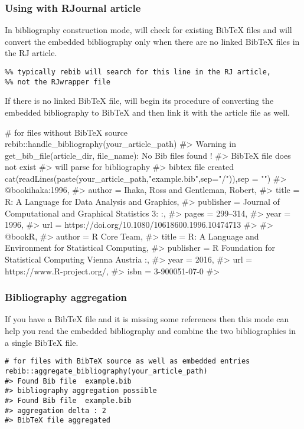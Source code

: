 \subsubsection{Using with RJournal article}
In bibliography construction mode,  will check for existing BibTeX files and will convert the embedded bibliography only when there are no linked BibTeX files in the RJ article.
\begin{verbatim}
%% typically rebib will search for this line in the RJ article, 
%% not the RJwrapper file

\end{verbatim}
If there is no linked BibTeX file,  will begin its procedure of converting the embedded bibliography to BibTeX and then link it with the article file as well.
\begin{Schunk}
\begin{Sinput}
# for files without BibTeX source
rebib::handle_bibliography(your_article_path)
#> Warning in get_bib_file(article_dir, file_name): No Bib files found !
#> BibTeX file does not exist
#> will parse for bibliography
#> bibtex file created
cat(readLines(paste(your_article_path,"example.bib",sep="/")),sep = "\n")
#> @book{ihaka:1996,
#> author = {{Ihaka, Ross and Gentleman, Robert}},
#> title = {{R: A Language for Data Analysis and Graphics}},
#> publisher = {Journal of Computational and Graphical Statistics 3:   :},
#> pages = {299--314},
#> year = {1996},
#> url = {https://doi.org/10.1080/10618600.1996.10474713}
#> }
#> @book{R,
#> author = {R {Core Team}},
#> title = {{R: A Language and Environment for Statistical Computing}},
#> publisher = {R Foundation for Statistical Computing Vienna Austria    :},
#> year = {2016},
#> url = {https://www.R-project.org/},
#> isbn = {3-900051-07-0}
#> }
\end{Sinput}
\end{Schunk}

\subsubsection{Bibliography aggregation}

If you have a BibTeX file and it is missing some references then this mode can help you read the embedded bibliography and combine the two bibliographies in a single BibTeX file.
\begin{verbatim}
# for files with BibTeX source as well as embedded entries
rebib::aggregate_bibliography(your_article_path)
#> Found Bib file  example.bib
#> bibliography aggregation possible
#> Found Bib file  example.bib
#> aggregation delta : 2
#> BibTeX file aggregated
\end{verbatim}


